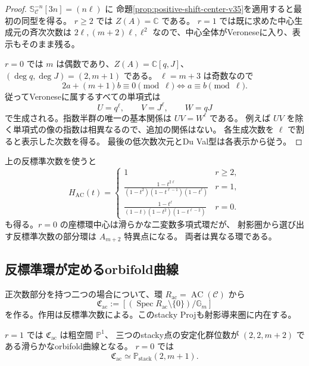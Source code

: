 \begin{proof}
$\mathbb S_{\mathcal C}^{-n}[3n]=(n\ell)$ に
命題\ref{prop:positive-shift-center-v35}を適用すると最初の同型を得る。
$r\ge2$ では $Z(A)=\mathbb C$ である。
$r=1$ では既に求めた中心生成元の斉次次数は
$2\ell,(m+2)\ell,\ell^2$ なので、中心全体がVeroneseに入り、表示もそのまま残る。

$r=0$ では $m$ は偶数であり、$Z(A)=\mathbb C[q,J]$、
$(\deg q,\deg J)=(2,m+1)$ である。
$\ell=m+3$ は奇数なので
\[
 2a+(m+1)b\equiv0\pmod\ell
 \iff a\equiv b\pmod\ell.
\]
従ってVeroneseに属するすべての単項式は
\[
 U=q^\ell,\qquad V=J^\ell,\qquad W=qJ
\]
で生成される。指数半群の唯一の基本関係は $UV=W^\ell$ である。
例えば $UV$ を除く単項式の像の指数は相異なるので、追加の関係はない。
各生成次数を $\ell$ で割ると表示した次数を得る。
最後の低次数次元とDu Val型は各表示から従う。
\end{proof}

\begin{remark}[Hilbert級数]
上の反標準次数を使うと
\[
 H_{\operatorname{AC}}(t)=
 \begin{cases}
 1&r\ge2,\\[1mm]
 \displaystyle\frac{1-t^{2\ell}}
 {(1-t^2)(1-t^{\ell-1})(1-t^\ell)}&r=1,\\[3mm]
 \displaystyle\frac{1-t^\ell}
 {(1-t)(1-t^2)(1-t^{\ell-2})}&r=0.
 \end{cases}
\]
も得る。$r=0$ の座標環中心は滑らかな二変数多項式環だが、
射影圏から選び出す反標準次数の部分環は $A_{m+2}$ 特異点になる。
両者は異なる環である。
\end{remark}

\subsection{反標準環が定めるorbifold曲線}

正次数部分を持つ二つの場合について、環 $R_{\mathrm{ac}}=\operatorname{AC}(\mathcal C)$ から
\[
 \mathfrak C_{\mathrm{ac}}
 :=[(\operatorname{Spec}R_{\mathrm{ac}}\setminus\{0\})/\mathbb G_m]
\]
を作る。作用は反標準次数による。このstacky Projも射影導来圏に内在する。

\begin{proposition}
\label{prop:anticanonical-orbifold-v35}
$r=1$ では $\mathfrak C_{\mathrm{ac}}$ は粗空間 $\mathbb P^1$、
三つのstacky点の安定化群位数が $(2,2,m+2)$ である滑らかなorbifold曲線となる。
$r=0$ では
\[
 \mathfrak C_{\mathrm{ac}}\simeq\mathbb P_{\mathrm{stack}}(2,m+1).
\]
\end{proposition}

